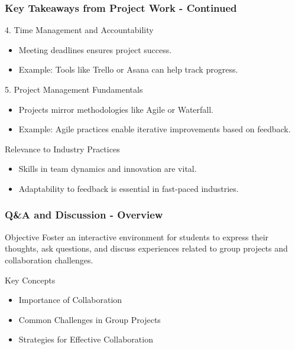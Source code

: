 \documentclass[aspectratio=169]{beamer}
\begin{document}
\begin{frame}[fragile]
    \frametitle{Key Takeaways from Project Work - Continued}
    \begin{block}{4. Time Management and Accountability}
        \begin{itemize}
            \item Meeting deadlines ensures project success.
            \item Example: Tools like Trello or Asana can help track progress.
        \end{itemize}
    \end{block}

    \begin{block}{5. Project Management Fundamentals}
        \begin{itemize}
            \item Projects mirror methodologies like Agile or Waterfall.
            \item Example: Agile practices enable iterative improvements based on feedback.
        \end{itemize}
    \end{block}

    \begin{block}{Relevance to Industry Practices}
        \begin{itemize}
            \item Skills in team dynamics and innovation are vital.
            \item Adaptability to feedback is essential in fast-paced industries.
        \end{itemize}
    \end{block}
\end{frame}

\begin{frame}[fragile]
    \frametitle{Q\&A and Discussion - Overview}
    \begin{block}{Objective}
        Foster an interactive environment for students to express their thoughts, ask questions, and discuss experiences related to group projects and collaboration challenges.
    \end{block}
    \begin{block}{Key Concepts}
        \begin{itemize}
            \item Importance of Collaboration
            \item Common Challenges in Group Projects
            \item Strategies for Effective Collaboration
        \end{itemize}
    \end{block}
\end{frame}
\end{document}
